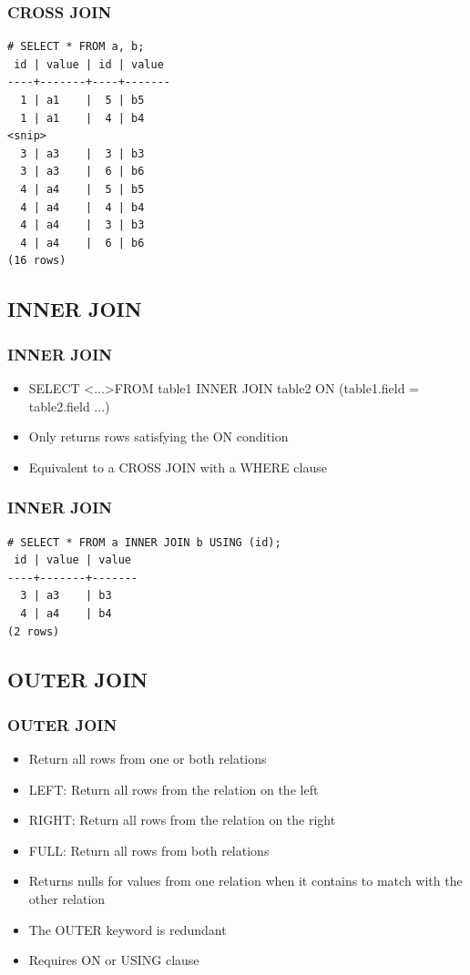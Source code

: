 \documentclass{beamer}
\begin{document}
\begin{frame}[fragile]
    \frametitle{CROSS JOIN}
    \begin{verbatim}
# SELECT * FROM a, b;
 id | value | id | value
----+-------+----+-------
  1 | a1    |  5 | b5
  1 | a1    |  4 | b4
<snip>
  3 | a3    |  3 | b3
  3 | a3    |  6 | b6
  4 | a4    |  5 | b5
  4 | a4    |  4 | b4
  4 | a4    |  3 | b3
  4 | a4    |  6 | b6
(16 rows)
    \end{verbatim}
\end{frame}

\subsection{INNER JOIN}
\begin{frame}
    \frametitle{INNER JOIN}
    \begin{itemize}
        \item SELECT \textless ...\textgreater FROM table1 INNER JOIN table2 ON (table1.field = table2.field ...)
        \item Only returns rows satisfying the ON condition
        \item Equivalent to a CROSS JOIN with a WHERE clause
    \end{itemize}
\end{frame}

\begin{frame}[fragile]
    \frametitle{INNER JOIN}
    \begin{verbatim}
# SELECT * FROM a INNER JOIN b USING (id);
 id | value | value
----+-------+-------
  3 | a3    | b3
  4 | a4    | b4
(2 rows)
    \end{verbatim}
\end{frame}

\subsection{OUTER JOIN}
\begin{frame}
    \frametitle{OUTER JOIN}
    \begin{itemize}
        \item Return all rows from one or both relations
        \item LEFT: Return all rows from the relation on the left
        \item RIGHT: Return all rows from the relation on the right
        \item FULL: Return all rows from both relations
        \item Returns nulls for values from one relation when it contains to match with the other relation
        \item The OUTER keyword is redundant
        \item Requires ON or USING clause
    \end{itemize}
\end{frame}
\end{document}
